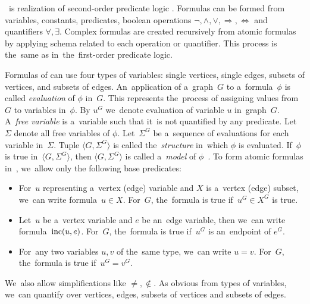 \MSO{}~is realization of second-order predicate logic%
.
Formulas can be formed from
variables, constants, predicates,
boolean operations \( \lnot, \land, \lor, \Rightarrow, \Leftrightarrow \)
and quantifiers \( \forall, \exists \).
Complex formulas are created recursively from atomic formulas
by applying schema related to each operation or quantifier.
This process is the~same as in~the~first-order predicate logic.

Formulas of \MSO{} can use four types of variables:
single vertices, single edges, subsets of vertices, and subsets of edges.
%
An~application of a~graph~\( G \) to a~formula~\( \phi \) is called \emph{evaluation}
of \( \phi \) in~\( G \).
This represents the~process of assigning values from \( G \) to variables in~\( \phi \).
%
By \( u^G \) we~denote evaluation of variable \( u \) in~graph~\( G \).
%
A~\emph{free variable} is a~variable such that it~is not quantified by any predicate.
Let~\( \Sigma \) denote all free variables of \( \phi \).
%
Let~\( \Sigma^G \) be a~sequence of evaluations for each variable in~\( \Sigma \).
Tuple \( \langle G, \Sigma^G \rangle \) is called the~\emph{structure}
in~which \( \phi \) is evaluated.
If~\( \phi \) is true in~\( \langle G, \Sigma^G \rangle \),
then \( \langle G, \Sigma^G \rangle \)
is called a~\emph{model} of \( \phi \)~\cite{book_parametrized_algorithms}.
%
To form atomic formulas in~\MSO{}, we~allow only the following base predicates:
%
\begin{itemize}
	\item For~\( u \) representing a~vertex (edge) variable
	      and \( X \) is a~vertex (edge) subset,
	      we~can write formula~\( u \in X \).
	      For~\( G \), the~formula is true if~\( u^G \in X^G \) is true.
	\item Let~\( u \) be a~vertex variable and \( e \) be an~edge variable,
	      then we~can write formula~\( \text{inc} (u, e) \).
	      For~\( G \), the~formula is true if~\( u^G \) is an~endpoint of \( e^G \).
	\item For~any two variables \( u, v \) of the~same type, we~can write \( u = v \).
	      For~\( G \), the~formula is true if~\( u^G = v^G \).
\end{itemize}
%
We~also allow simplifications like \( \ne, \not\in \).
As obvious from types of variables, we~can quantify over vertices, edges,
subsets of vertices and subsets of edges.

